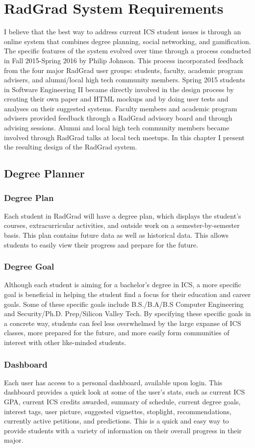 \chapter{RadGrad System Requirements}
I believe that the best way to address current ICS student issues is through an online system that combines degree planning, social networking, and gamification. The specific features of the system evolved over time through a process conducted in Fall 2015-Spring 2016 by Philip Johnson. This process incorporated feedback from the four major RadGrad user groups: students, faculty, academic program advisers, and alumni/local high tech community members. Spring 2015 students in Software Engineering II became directly involved in the design process by creating their own paper and HTML mockups and by doing user tests and analyses on their suggested systems. Faculty members and academic program advisers provided feedback through a RadGrad advisory board and through advising sessions. Alumni and local high tech community members became involved through RadGrad talks at local tech meetups. In this chapter I present the resulting design of the RadGrad system. 
\section{Degree Planner}
\subsection{Degree Plan}
Each student in RadGrad will have a degree plan, which displays the student's courses, extracurricular activities, and outside work on a semester-by-semester basis. This plan contains future data as well as historical data. This allows students to easily view their progress and prepare for the future. 
\subsection{Degree Goal}
Although each student is aiming for a bachelor's degree in ICS, a more specific goal is beneficial in helping the student find a focus for their education and career goals. Some of these specific goals include B.S./B.A/B.S Computer Engineering and Security/Ph.D. Prep/Silicon Valley Tech. By specifying these specific goals in a concrete way, students can feel less overwhelmed by the large expanse of ICS classes, more prepared for the future, and more easily form communities of interest with other like-minded students.
\subsection{Dashboard}
Each user has access to a personal dashboard, available upon login. This dashboard provides a quick look at some of the user's stats, such as current ICS GPA, current ICS credits awarded, summary of schedule, current degree goals, interest tags, user picture, suggested vignettes, stoplight, recommendations, currently active petitions, and predictions. This is a quick and easy way to provide students with a variety of information on their overall progress in their major. 

